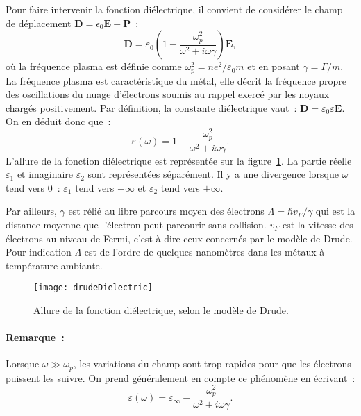 Pour faire intervenir la fonction diélectrique, il convient de considérer le champ de déplacement $\mathbf{D} = \epsilon_0 \mathbf{E} + \mathbf{P}	$~:
\begin{equation}
\textbf{D} = \varepsilon_0\left(1-\dfrac{\omega_p^2}{\omega^2+i\omega\gamma}\right)\textbf{E},
\end{equation}
où la fréquence plasma est définie comme $\omega_p^2 = ne^2/\varepsilon_0m$ et en posant $\gamma = \Gamma/m$. La fréquence plasma est caractéristique du métal, elle décrit la fréquence propre des oscillations du nuage d'électrons soumis au rappel exercé par les noyaux chargés positivement. Par définition, la constante diélectrique vaut~: $\textbf{D} = \varepsilon_0\varepsilon \textbf{E}$. On en déduit donc que~:
\begin{equation}
\varepsilon(\omega) = 1-\dfrac{\omega_p^2}{\omega^2+i\omega\gamma}.
\end{equation}
L'allure de la fonction diélectrique est représentée sur la figure~\ref{drudeDielectric}. La partie réelle $\varepsilon_1$ et imaginaire $\varepsilon_2$ sont représentées séparément. Il y a une divergence lorsque $\omega$ tend vers 0~: $\varepsilon_1$ tend vers $-\infty$ et $\varepsilon_2$ tend vers $+\infty$.\par 
Par ailleurs, $\gamma$ est rélié au libre parcours moyen des électrons $\Lambda = \hbar v_F/\gamma$ qui est la distance moyenne que l'électron peut parcourir sans collision. $v_F$ est la vitesse des électrons au niveau de Fermi, c'est-à-dire ceux concernés par le modèle de Drude. Pour indication $\Lambda$ est de l'ordre de quelques nanomètres dans les métaux à température ambiante.\par 
\begin{figure}[!htb]
	\centering
	\texttt{[image: drudeDielectric]}
	\caption{Allure de la fonction diélectrique, selon le modèle de Drude.}
	\label{drudeDielectric}
\end{figure}
\paragraph*{Remarque~:} Lorsque $\omega\gg\omega_p$, les variations du champ sont trop rapides pour que les électrons puissent les suivre. On prend généralement en compte ce phénomène en écrivant~:
\begin{equation}
\varepsilon(\omega) = \varepsilon_\infty-\dfrac{\omega_p^2}{\omega^2+i\omega\gamma}.
\end{equation}
